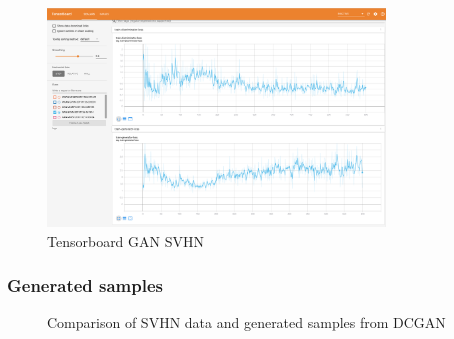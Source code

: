 \documentclass{article}
\begin{document}
\begin{figure}[!htb]
  \centering
  \includegraphics[width=0.8\textwidth]{tensorboard-GAN-SVHN.png}
  \caption{Tensorboard GAN SVHN}
  \label{fig:TB_GAN_SVHN}
\end{figure}

\subsubsection{Generated samples}

\begin{figure}[!htb]
  \centering
  \caption{Comparison of SVHN data and generated samples from DCGAN}
  \label{fig:DCGAN_SVHN}
\end{figure}
\end{document}
